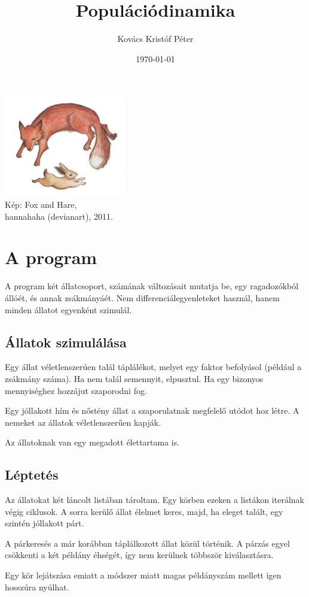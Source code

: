 \documentclass[twoside]{article}
\title{Populációdinamika}
\date{\today}
\author{Kovács Kristóf Péter}
\begin{document}
	
	\maketitle
	\begin{center}
		\includegraphics[width = 0.4\textwidth]{fox_n_rabbits}
		\\
		\tiny{Kép: Fox and Hare,
		\\hannahaha (devianart), 2011.}
	\end{center}
	\pagebreak
	\section*{A program}
		A program két állatcsoport, számának változásait mutatja be, egy ragadozókból állóét, és annak zsákmányáét. Nem differenciálegyenleteket használ, hanem minden állatot egyenként szimulál.
		\subsection*{Állatok szimulálása}
		Egy állat véletlenszerúen talál táplálékot, melyet egy faktor befolyásol (például a zsákmány száma). Ha nem talál semennyit, elpusztul. Ha egy bizonyos mennyiséghez hozzájut szaporodni fog.
		\par Egy jóllakott hím és nőstény állat a szaporulatnak megfelelő utódot hoz létre. A nemeket az állatok véletlenszerűen kapják.
		\par Az állatoknak van egy megadott élettartama is.
		\subsection*{Léptetés}
		Az állatokat két láncolt listában tároltam. Egy körben ezeken a listákon iterálnak végig ciklusok. A sorra kerülő állat élelmet keres, majd, ha eleget talált, egy szintén jóllakott párt.
		\par A párkeresés a már korábban táplálkozott állat közül történik. A párzás egyel csökkenti a két példány éhségét, így nem kerülnek többször kiválasztásra.
		\par Egy kör lejátszása emiatt a módszer miatt magas példányszám mellett igen hosszúra nyúlhat.
		
\end{document}
